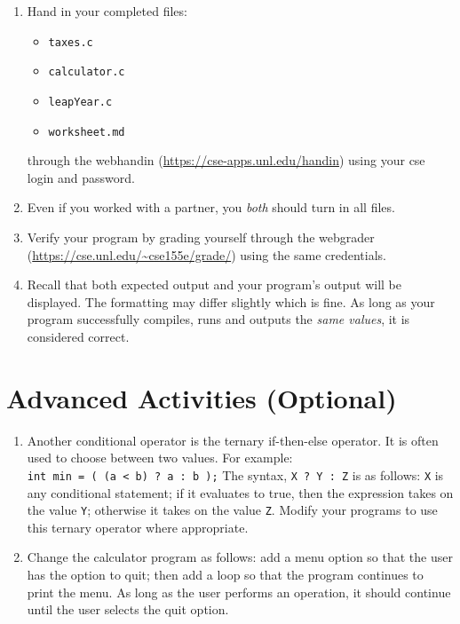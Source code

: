 \documentclass[12pt]{scrartcl}
\begin{document}
\begin{enumerate}
  \item Hand in your completed files:
  \begin{itemize}
    \item \texttt{taxes.c}
    \item \texttt{calculator.c}
    \item \texttt{leapYear.c}
    \item \texttt{worksheet.md}
  \end{itemize}
  through the webhandin (\url{https://cse-apps.unl.edu/handin}) 
  using your cse login and password.  
  \item Even if you worked with a partner, you \emph{both} should
  turn in all files.
  \item Verify your program by grading yourself through the
  webgrader (\url{https://cse.unl.edu/~cse155e/grade/}) using the
  same credentials.
  \item Recall that both expected output and your program's output
  will be displayed.  The formatting may differ slightly which is fine.
  As long as your program successfully compiles, runs and outputs 
  the \emph{same values}, it is considered correct.
\end{enumerate}


\section{Advanced Activities (Optional)}

\begin{enumerate}
  \item Another conditional operator is the ternary if-then-else operator.  
  	It is often used to choose between two values.  For example:\\	
	\texttt{int min = ( (a < b) ? a : b );}
	The syntax, \texttt{X ? Y : Z} is as follows: \texttt{X} 
	is any conditional statement; if it evaluates to true, then the 
	expression takes on the value \texttt{Y}; otherwise it takes 
	on the value \texttt{Z}.  Modify your programs to use this 
	ternary operator where appropriate.
  \item Change the calculator program as follows: add a menu option 
	so that the user has the option to quit; then add a loop so that 
	the program continues to print the menu.  As long as the user 
	performs an operation, it should continue until the user selects 
	the quit option.
\end{enumerate}
\end{document}
